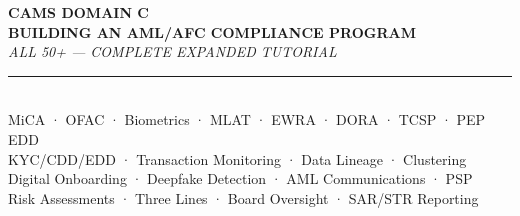 \documentclass[12pt,aspectratio=169]{beamer}
\begin{document}
	
	\begin{frame}
		\centering
		\vspace{0.3cm}
		{\fontsize{18}{22}\selectfont \textbf{CAMS DOMAIN C}}\\[0.1cm]
		{\fontsize{14}{17}\selectfont \textbf{BUILDING AN AML/AFC COMPLIANCE PROGRAM}}\\[0.15cm]
		{\fontsize{9}{11}\selectfont \textit{ALL 50+ — COMPLETE EXPANDED TUTORIAL}}\\[0.08cm]
		\rule{4cm}{0.5pt}\\[0.08cm]
		{\fontsize{6}{7}\selectfont MiCA · OFAC · Biometrics · MLAT · EWRA · DORA · TCSP · PEP EDD}\\[0.04cm]
		{\fontsize{6}{7}\selectfont KYC/CDD/EDD · Transaction Monitoring · Data Lineage · Clustering}\\[0.04cm]
		{\fontsize{6}{7}\selectfont Digital Onboarding · Deepfake Detection · AML Communications · PSP}\\[0.04cm]
		{\fontsize{6}{7}\selectfont Risk Assessments · Three Lines · Board Oversight · SAR/STR Reporting}
		\vspace{0.2cm}
	\end{frame}
	
\end{document}
